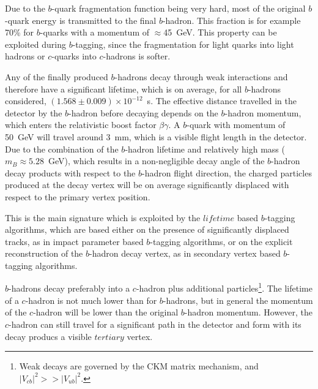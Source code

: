 Due to the $b$-quark fragmentation function being very hard, most of the original $b$-quark energy is transmitted to the final $b$-hadron. This fraction is for example 70\% for $b$-quarks with a momentum of $\approx$45~GeV. This property can be exploited during $b$-tagging, since the fragmentation for light quarks into light hadrons or $c$-quarks into $c$-hadrons is softer.

Any of the finally produced $b$-hadrons decay through weak interactions and therefore have a significant lifetime, which is on average, for all $b$-hadrons considered, $(1.568\pm0.009) \times 10^{-12}$~s.  The effective distance travelled in the detector by the $b$-hadron before decaying depends on the $b$-hadron momentum, which enters the relativistic boost factor $\beta\gamma$. A $b$-quark with momentum of 50~GeV will travel around 3~mm, which is a visible flight length in the detector. Due to the combination of the $b$-hadron lifetime and relatively high mass ($m_B \approx 5.28$~GeV), which results in a non-negligible decay angle of the $b$-hadron decay products %
with respect to the $b$-hadron flight direction, the charged particles produced at the decay vertex will be on average significantly displaced with respect to the primary vertex position.

This is the main signature which is exploited by the $lifetime$ based $b$-tagging algorithms, which are based either on the presence of significantly displaced tracks, as in impact parameter based $b$-tagging algorithms, or on the explicit reconstruction of the $b$-hadron decay vertex, as in secondary vertex based $b$-tagging algorithms.


$b$-hadrons decay preferably into a $c$-hadron plus additional particles\footnote{Weak decays are governed by the CKM matrix mechanism, and $|V_{cb}|^2 >> |V_{ub}|^2$.}. The lifetime of a $c$-hadron is not much lower than for $b$-hadrons, but in general the momentum of the $c$-hadron will be lower than the original $b$-hadron momentum. However, the $c$-hadron can still travel for a significant path in the detector and form with its decay producs a visible $tertiary$ vertex. 


